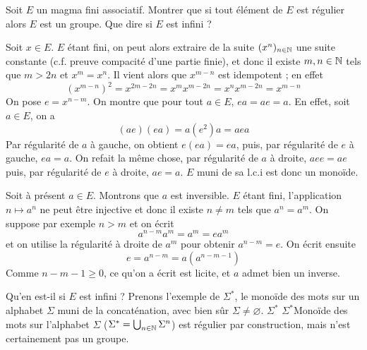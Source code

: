 \begin{exo}
    \label{strictalg1}
    Soit $E$ un magma fini associatif. Montrer que si tout élément de $E$ est régulier alors $E$ est un groupe. Que dire si $E$ est infini ?
\end{exo}

\begin{solution}
    Soit $x\in E$. $E$ étant fini, on peut alors extraire de la suite $(x^n)_{n\in\operatorname{\mathbb N}}$ une suite constante (c.f. preuve compacité d'une partie finie), 
    et donc il existe $m,n \in\operatorname{\mathbb N}$ tels que $m>2n$ et $x^m=x^n$. Il vient alors que $x^{m-n}$ est idempotent ; en effet \[(x^{m-n})^2=x^{2m-2n}=x^mx^{m-2n}=x^nx^{m-2n}=x^{m-n}\]
    On pose $e=x^{n-m}$. On montre que pour tout $a\in E$, $ea=ae=a$. En effet, soit $a\in E$, on a \[(ae)(ea)=a(e^2)a=aea\]
    Par régularité de $a$ à gauche, on obtient $e(ea)=ea$, puis, par régularité de $e$ à gauche, $ea=a$. 
    On refait la même chose, par régularité de $a$ à droite, $aee=ae$ puis, par régularité de $e$ à droite, $ae=a$. $E$ muni de sa l.c.i est donc un monoïde.

    Soit à présent $a\in E$. Montrons que $a$ est inversible. $E$ étant fini, l'application $n\mapsto a^n$ ne peut être injective et donc il existe $n\neq m$ tels que $a^n=a^m$. 
    On suppose par exemple $n>m$ et on écrit \[a^{n-m}a^m=a^m=ea^m\]
    et on utilise la régularité à droite de $a^m$ pour obtenir $a^{n-m}=e$. On écrit ensuite \[e=a^{n-m}=a(a^{n-m-1})\]
    Comme $n-m-1\geq 0$, ce qu'on a écrit est licite, et $a$ admet bien un inverse.
 
    Qu'en est-il si $E$ est infini ? Prenons l'exemple de $\Sigma^*$, le monoïde des mots sur un alphabet $\Sigma$ muni de la concaténation, 
    avec bien sûr $\Sigma\neq\varnothing$. $\Sigma^*$ $\Sigma^*${Monoïde des mots sur l'alphabet $\Sigma$ 
    ($\Sigma^*=\bigcup_{n\in\operatorname{\mathbb N}}\Sigma^n$)} est régulier par construction, mais n'est certainement pas un groupe.
\end{solution}